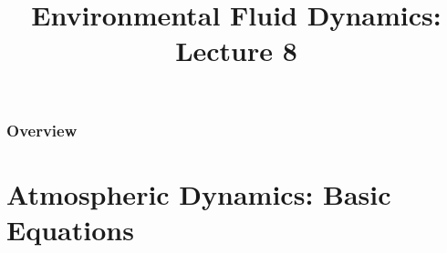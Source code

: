 
\title{Environmental Fluid Dynamics: Lecture 8}
\usepackage{esvect}
\newcommand{\fontsizeone}{1.9em}
\newcommand{\framecard}[2][colorgreen]{
  {\setbeamercolor{background canvas}{bg=#1}
    \begin{frame}[plain]
    \vfill
    \begin{center}
     {#2}
    \end{center}
    \vfill
    \end{frame}
  }
}



\begin{frame} 
  \titlepage
\end{frame}


\begin{frame}
\frametitle{Overview}
\tableofcontents
\end{frame}

\section{Atmospheric Dynamics: Basic Equations} %
